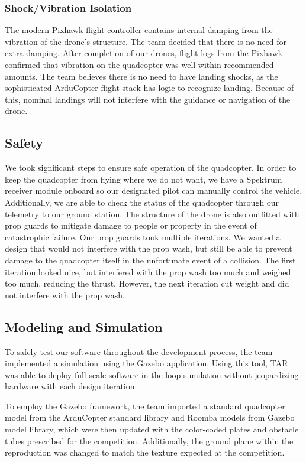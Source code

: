 \documentclass[12pt,letterpaper]{article}
\begin{document}
		\subsubsection*{Shock/Vibration Isolation}
		The modern Pixhawk flight controller contains internal damping from the vibration of the drone's structure. The team decided that there is no need for extra damping. After completion of our drones, flight logs from the Pixhawk confirmed that vibration on the quadcopter was well within recommended amounts. The team believes there is no need to have landing shocks, as the sophisticated ArduCopter flight stack has logic to recognize landing. Because of this, nominal landings will not interfere with the guidance or navigation of the drone.


	\subsection*{Safety}
		We took significant steps to ensure safe operation of the quadcopter. In order to keep the quadcopter from flying where we do not want, we have a Spektrum receiver module onboard so our designated pilot can manually control the vehicle. Additionally, we are able to check the status of the quadcopter through our telemetry to our ground station. The structure of the drone is also outfitted with prop guards to mitigate damage to people or property in the event of catastrophic failure. Our prop guards took multiple iterations. We wanted a design that would not interfere with the prop wash, but still be able to prevent damage to the quadcopter itself in the unfortunate event of a collision. The first iteration looked nice, but interfered with the prop wash too much and weighed too much, reducing the thrust. However, the next iteration cut weight and did not interfere with the prop wash.


	\subsection*{Modeling and Simulation}

		To safely test our software throughout the development process, the team implemented a simulation using the Gazebo application. Using this tool, TAR was able to deploy full-scale software in the loop simulation without jeopardizing hardware with each design iteration.

		To employ the Gazebo framework, the team imported a standard quadcopter model from the ArduCopter standard library and Roomba models from Gazebo model library, which were then updated with the color-coded plates and obstacle tubes prescribed for the competition. Additionally, the ground plane within the reproduction was changed to match the texture expected at the competition.
\end{document}

